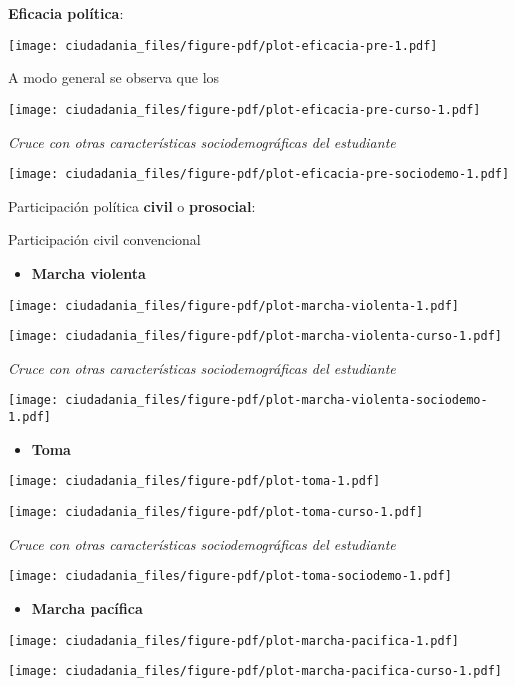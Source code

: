 \documentclass[
  letterpaper,
  DIV=11,
  numbers=noendperiod]{scrreprt}
\providecommand{\tightlist}{%
  \setlength{\itemsep}{0pt}\setlength{\parskip}{0pt}}\usepackage{longtable,booktabs,array}
\begin{document}
\textbf{Eficacia política}:

\texttt{[image: ciudadania\_files/figure-pdf/plot-eficacia-pre-1.pdf]}

A modo general se observa que los

\texttt{[image: ciudadania\_files/figure-pdf/plot-eficacia-pre-curso-1.pdf]}

\emph{Cruce con otras características sociodemográficas del estudiante}

\texttt{[image: ciudadania\_files/figure-pdf/plot-eficacia-pre-sociodemo-1.pdf]}

Participación política \textbf{civil} o \textbf{prosocial}:

Participación civil convencional

\begin{itemize}
\tightlist
\item
  \textbf{Marcha violenta}
\end{itemize}

\texttt{[image: ciudadania\_files/figure-pdf/plot-marcha-violenta-1.pdf]}

\texttt{[image: ciudadania\_files/figure-pdf/plot-marcha-violenta-curso-1.pdf]}

\emph{Cruce con otras características sociodemográficas del estudiante}

\texttt{[image: ciudadania\_files/figure-pdf/plot-marcha-violenta-sociodemo-1.pdf]}

\begin{itemize}
\tightlist
\item
  \textbf{Toma}
\end{itemize}

\texttt{[image: ciudadania\_files/figure-pdf/plot-toma-1.pdf]}

\texttt{[image: ciudadania\_files/figure-pdf/plot-toma-curso-1.pdf]}

\emph{Cruce con otras características sociodemográficas del estudiante}

\texttt{[image: ciudadania\_files/figure-pdf/plot-toma-sociodemo-1.pdf]}

\begin{itemize}
\tightlist
\item
  \textbf{Marcha pacífica}
\end{itemize}

\texttt{[image: ciudadania\_files/figure-pdf/plot-marcha-pacifica-1.pdf]}

\texttt{[image: ciudadania\_files/figure-pdf/plot-marcha-pacifica-curso-1.pdf]}
\end{document}
